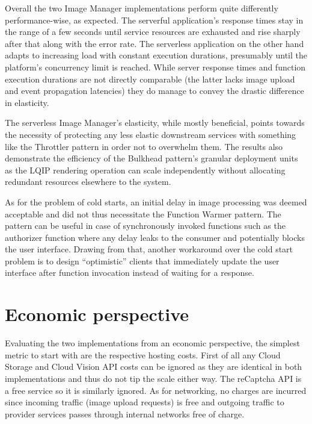 Overall the two Image Manager implementations perform quite differently performance-wise, as expected. The serverful application's response times stay in the range of a few seconds until service resources are exhausted and rise sharply after that along with the error rate. The serverless application on the other hand adapts to increasing load with constant execution durations, presumably until the platform's concurrency limit is reached. While server response times and function execution durations are not directly comparable (the latter lacks image upload and event propagation latencies) they do manage to convey the drastic difference in elasticity.

The serverless Image Manager's elasticity, while mostly beneficial, points towards the necessity of protecting any less elastic downstream services with something like the Throttler pattern in order not to overwhelm them. The results also demonstrate the efficiency of the Bulkhead pattern's granular deployment units as the LQIP rendering operation can scale independently without allocating redundant resources elsewhere to the system.

As for the problem of cold starts, an initial delay in image processing was deemed acceptable and did not thus necessitate the Function Warmer pattern. The pattern can be useful in case of synchronously invoked functions such as the authorizer function where any delay leaks to the consumer and potentially blocks the user interface. Drawing from that, another workaround over the cold start problem is to design ``optimistic'' clients that immediately update the user interface after function invocation instead of waiting for a response.

\section{Economic perspective}

Evaluating the two implementations from an economic perspective, the simplest metric to start with are the respective hosting costs. First of all any Cloud Storage and Cloud Vision API costs can be ignored as they are identical in both implementations and thus do not tip the scale either way. The reCaptcha API is a free service so it is similarly ignored. As for networking, no charges are incurred since incoming traffic (image upload requests) is free and outgoing traffic to provider services passes through internal networks free of charge.

